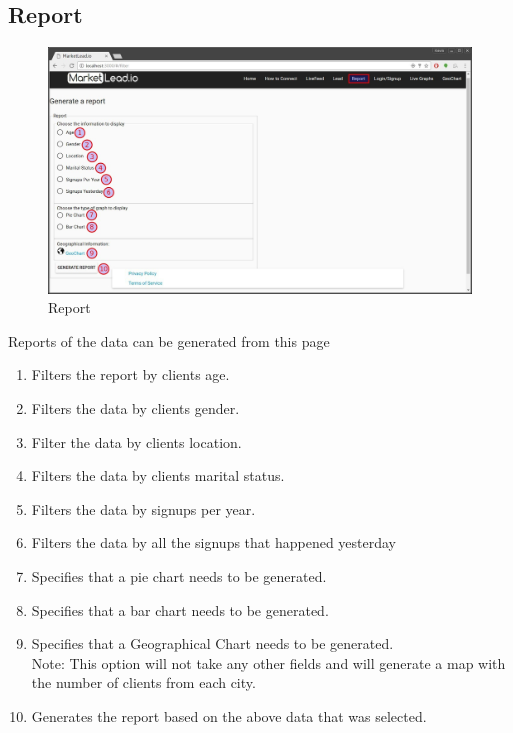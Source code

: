 \documentclass{article}
\begin{document}
		\subsection{Report}
			\begin{figure}[H]
				\includegraphics[width=\textwidth]{images/report.jpg}
				\caption{Report}
				\label{fig:report}
			\end{figure}
			Reports of the data can be generated from this page
			\begin{enumerate}
				\item Filters the report by clients age.
				\item Filters the data by clients gender.
				\item Filter the data by clients location.
				\item Filters the data by clients marital status.
				\item Filters the data by signups per year.
				\item Filters the data by all the signups that happened yesterday
				\item Specifies that a pie chart needs to be generated.
				\item Specifies that a bar chart needs to be generated.
				\item Specifies that a Geographical Chart needs to be generated.\\
					Note: This option will not take any other fields and will generate a map with the number of clients from each city.
				\item Generates the report based on the above data that was selected.
			\end{enumerate}
\end{document}
